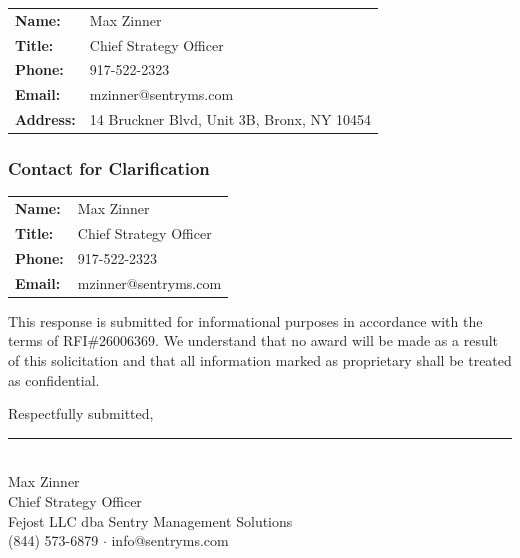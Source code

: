 \vspace{0.3cm}

\begin{tabular}{ll}
    \textbf{Name:}    & Max Zinner \\
    \textbf{Title:}   & Chief Strategy Officer \\
    \textbf{Phone:}   & 917-522-2323 \\
    \textbf{Email:}   & mzinner@sentryms.com \\
    \textbf{Address:} & 14 Bruckner Blvd, Unit 3B, Bronx, NY 10454 \\
\end{tabular}

\vspace{0.3cm}

\subsubsection*{Contact for Clarification}

\begin{tabular}{ll}
    \textbf{Name:}    & Max Zinner \\
    \textbf{Title:}   & Chief Strategy Officer \\
    \textbf{Phone:}   & 917-522-2323 \\
    \textbf{Email:}   & mzinner@sentryms.com \\
\end{tabular}

\vspace{0.3cm}

This response is submitted for informational purposes in accordance with the terms of RFI\#26006369. We understand that no award will be made as a result of this solicitation and that all information marked as proprietary shall be treated as confidential.

\vspace{1cm}

Respectfully submitted,

\vspace{1.2cm}

\rule{6cm}{0.4pt}\\
Max Zinner\\
Chief Strategy Officer\\
Fejost LLC dba Sentry Management Solutions\\
(844) 573-6879 $\cdot$ info@sentryms.com
